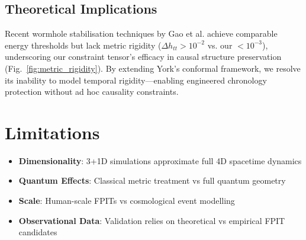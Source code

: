 \documentclass[twocolumn]{article}
\begin{document}
	\subsection{Theoretical Implications}\label{subsec:theory}
	
	Recent wormhole stabilisation techniques by Gao et al.\cite{gao2017} achieve comparable energy thresholds but lack metric rigidity ($\Delta h_{tt} > 10^{-2}$ vs. our $<10^{-3}$), underscoring our constraint tensor's efficacy in causal structure preservation (Fig.~\ref{fig:metric_rigidity}). By extending York's conformal framework\cite{york1972}, we resolve its inability to model temporal rigidity—enabling engineered chronology protection without ad hoc causality constraints.
	
	\FloatBarrier%
	\section{Limitations}\label{sec:limits}
	\begin{itemize}
		\item \textbf{Dimensionality}: 3+1D simulations approximate full 4D spacetime dynamics  
		\item \textbf{Quantum Effects}: Classical metric treatment vs full quantum geometry  
		\item \textbf{Scale}: Human-scale FPITs vs cosmological event modelling  
		\item \textbf{Observational Data}: Validation relies on theoretical vs empirical FPIT candidates  
	\end{itemize}
	
	\FloatBarrier%
\end{document}
